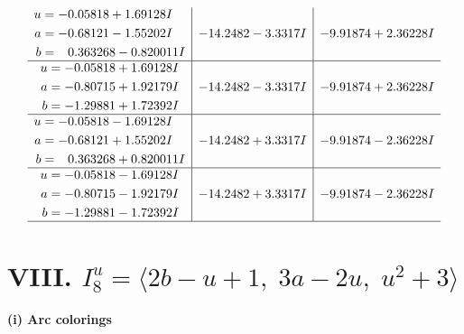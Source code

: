 \documentclass[1p]{elsarticle_modified}
\theoremstyle{definition}
\begin{document}
$$\begin{array}{c|c|c}
\begin{aligned}
u &= -0.05818 + 1.69128 I \\
a &= -0.68121 - 1.55202 I \\
b &= \phantom{-}0.363268 - 0.820011 I\end{aligned}
 & -14.2482 - 3.3317 I & -9.91874 + 2.36228 I \\ \hline\begin{aligned}
u &= -0.05818 + 1.69128 I \\
a &= -0.80715 + 1.92179 I \\
b &= -1.29881 + 1.72392 I\end{aligned}
 & -14.2482 - 3.3317 I & -9.91874 + 2.36228 I \\ \hline\begin{aligned}
u &= -0.05818 - 1.69128 I \\
a &= -0.68121 + 1.55202 I \\
b &= \phantom{-}0.363268 + 0.820011 I\end{aligned}
 & -14.2482 + 3.3317 I & -9.91874 - 2.36228 I \\ \hline\begin{aligned}
u &= -0.05818 - 1.69128 I \\
a &= -0.80715 - 1.92179 I \\
b &= -1.29881 - 1.72392 I\end{aligned}
 & -14.2482 + 3.3317 I & -9.91874 - 2.36228 I\\
 \hline 
 \end{array}$$\newpage\newpage\renewcommand{\arraystretch}{1}
\centering \section*{VIII. $I^u_{8}= \langle 2 b- u+1,\;3 a-2 u,\;u^2+3 \rangle$}
\flushleft \textbf{(i) Arc colorings}\\
\end{document}
